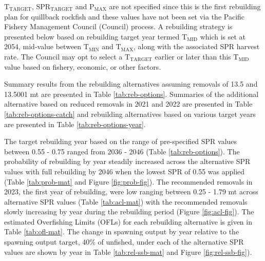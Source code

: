 \documentclass[11pt,
  english,
  a4paper,
]{article}
\begin{document}
{\(\text{T}_\text{TARGET}\)\leavevmode\tagmcend\tagstructend}, {\(\text{SPR}_\text{TARGET}\)\leavevmode\tagmcend\tagstructend} and {\(\text{P}_\text{MAX}\)\leavevmode\tagmcend\tagstructend} are not specified since this is the first rebuilding plan for quillback rockfish and these values have not been set via the Pacific Fishery Management Council (Council) process. A rebuilding strategy is presented below based on rebuilding target year termed {\(\text{T}_\text{MID}\)\leavevmode\tagmcend\tagstructend} which is set at 2054, mid-value between {\(\text{T}_\text{MIN}\)\leavevmode\tagmcend\tagstructend} and {\(\text{T}_\text{MAX}\)\leavevmode\tagmcend\tagstructend}, along with the associated SPR harvest rate. The Council may opt to select a {\(\text{T}_\text{TARGET}\)\leavevmode\tagmcend\tagstructend} earlier or later than this {\(\text{T}_\text{MID}\)\leavevmode\tagmcend\tagstructend} value based on fishery, economic, or other factors.

\leavevmode\tagmcend\tagstructend\par


Summary results from the rebuilding alternatives assuming removals of 13.5 and 13.5001 mt are presented in Table \ref{tab:reb-options}. Summaries of the additional alternative based on reduced removals in 2021 and 2022 are presented in Table \ref{tab:reb-options-catch} and rebuilding alternatives based on various target years are presented in Table \ref{tab:reb-options-year}.

\leavevmode\tagmcend\tagstructend\par


The target rebuilding year based on the range of pre-specified SPR values between 0.55 - 0.75 ranged from 2036 - 2046 (Table \ref{tab:reb-options}). The probability of rebuilding by year steadily increased across the alternative SPR values with full rebuilding by 2046 when the lowest SPR of 0.55 was applied (Table \ref{tab:prob-mat} and Figure \ref{fig:prob-fig}). The recommended removals in 2023, the first year of rebuilding, were low ranging between 0.25 - 1.79 mt across alternative SPR values (Table \ref{tab:acl-mat}) with the recommended removals slowly increasing by year during the rebuilding period (Figure \ref{fig:acl-fig}). The estimated Overfishing Limits (OFLs) for each rebuilding alternative is given in Table \ref{tab:ofl-mat}. The change in spawning output by year relative to the spawning output target, 40\% of unfished, under each of the alternative SPR values are shown by year in Table \ref{tab:rel-ssb-mat} and Figure \ref{fig:rel-ssb-fig}).
\end{document}
